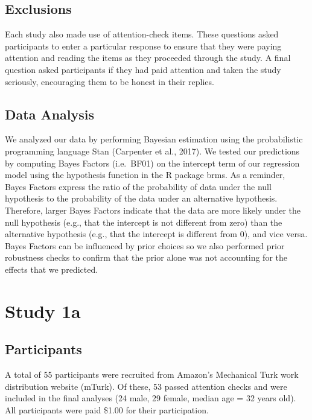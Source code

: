 \documentclass[10pt, letterpaper]{article}
\begin{document}
\subsection{Exclusions}\label{exclusions}

Each study also made use of attention-check items. These questions asked
participants to enter a particular response to ensure that they were
paying attention and reading the items as they proceeded through the
study. A final question asked participants if they had paid attention
and taken the study seriously, encouraging them to be honest in their
replies.

\subsection{Data Analysis}\label{data-analysis}

We analyzed our data by performing Bayesian estimation using the
probabilistic programming language Stan (Carpenter et al., 2017). We
tested our predictions by computing Bayes Factors (i.e.~BF01) on the
intercept term of our regression model using the hypothesis function in
the R package brms. As a reminder, Bayes Factors express the ratio of
the probability of data under the null hypothesis to the probability of
the data under an alternative hypothesis. Therefore, larger Bayes
Factors indicate that the data are more likely under the null hypothesis
(e.g., that the intercept is not different from zero) than the
alternative hypothesis (e.g., that the intercept is different from 0),
and vice versa. Bayes Factors can be influenced by prior choices so we
also performed prior robustness checks to confirm that the prior alone
was not accounting for the effects that we predicted.

\section{Study 1a}\label{study-1a}

\subsection{Participants}\label{participants}

A total of 55 participants were recruited from Amazon's Mechanical Turk
work distribution website (mTurk). Of these, 53 passed attention checks
and were included in the final analyses (24 male, 29 female, median age
= 32 years old). All participants were paid \$1.00 for their
participation.
\end{document}
